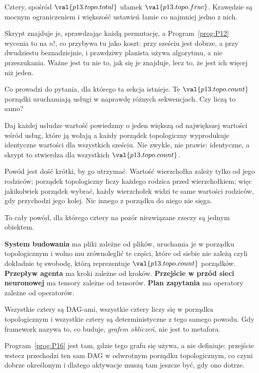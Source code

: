 \begin{fr}
Cztery, spośród $\val{p13.topo.total}$ \dash{} ułamek
$\val{p13.topo.frac}$. Krawędzie są mocnym ograniczeniem i większość ustawień
łamie co najmniej jedno z nich.

Skrypt znajduje je, sprawdzając każdą permutację, a
Program~\ref{prog:P12} wycenia to na $n!$, co przybywa tu jako koszt: przy
sześciu jest dobrze, a
przy dwudziestu beznadziejnie, i prawdziwy planista używa algorytmu, a nie
przeszukania. Ważne jest tu nie to, jak się je znajduje, lecz to, że jest ich
więcej niż jeden.

Co prowadzi do pytania, dla którego ta sekcja istnieje. Te
$\val{p13.topo.count}$ porządki uruchamiają usługi w naprawdę różnych
sekwencjach. Czy liczą to samo?
\dotline
\nextframe
\end{fr}

\begin{fr}
Daj każdej usłudze wartość \dash{} powiedzmy o jeden większą od największej
wartości wśród usług, które ją wołają \dash{} a każdy porządek topologiczny
wyprodukuje identyczne wartości dla wszystkich sześciu. Nie zwykle, nie prawie:
identyczne, a skrypt to stwierdza dla wszystkich $\val{p13.topo.count}$.


Powód jest dość krótki, by go utrzymać. Wartość wierzchołka zależy tylko od
jego rodziców; porządek topologiczny liczy każdego rodzica przed
wierzchołkiem; więc jakikolwiek porządek wybrać, każdy wierzchołek widzi te
same wartości rodziców, gdy przychodzi jego kolej. Nic innego z porządku do
niego nie sięga.

\end{fr}

\begin{fr}
\begin{aibox}
To cały powód, dla którego cztery na pozór niezwiązane rzeczy są jednym
obiektem.

\textbf{System budowania} ma pliki zależne od plików, uruchamia je w porządku
topologicznym i wolno mu zrównoleglić te części, które od siebie nie zależą
\dash{} czyli dokładnie tę swobodę, którą reprezentuje
$\val{p13.topo.count}$ porządków. \textbf{Przepływ agenta} ma kroki zależne od
kroków. \textbf{Przejście w przód sieci neuronowej} ma tensory zależne od
tensorów. \textbf{Plan zapytania} ma operatory zależne od operatorów.

Wszystkie cztery są DAG-ami, wszystkie cztery liczy się w porządku
topologicznym i wszystkie cztery są deterministyczne z tego samego powodu. Gdy
framework nazywa to, co buduje, \emph{grafem obliczeń}, nie jest to metafora.
\end{aibox}

Program~\ref{prog:P16} jest tam, gdzie tego grafu się używa, a nie definiuje:
przejście wstecz przechodzi ten sam DAG w odwrotnym porządku topologicznym, co
czyni  dobrze określonym i dlatego aktywacje muszą tam
jeszcze być, gdy ono dotrze.
\end{fr}

